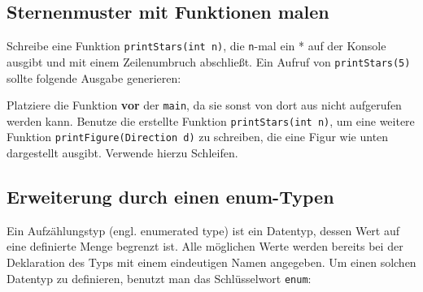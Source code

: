 \subsection{Sternenmuster mit Funktionen malen}

Schreibe eine Funktion \lstinline{printStars(int n)}, die \lstinline{n}-mal ein * auf der Konsole ausgibt und mit einem Zeilenumbruch abschließt.
Ein Aufruf von \lstinline{printStars(5)} sollte folgende Ausgabe generieren:


Platziere die Funktion \textbf{vor} der \lstinline{main}, da sie sonst von dort aus nicht aufgerufen werden kann.
Benutze die erstellte Funktion \lstinline{printStars(int n)}, um eine weitere Funktion \lstinline{printFigure(Direction d)} zu schreiben, die eine Figur wie unten dargestellt ausgibt.
Verwende hierzu Schleifen.



\subsection{Erweiterung durch einen enum-Typen}
\label{sec:basics_enumtype}
Ein Aufzählungstyp (engl. enumerated type) ist ein Datentyp, dessen Wert auf eine definierte Menge begrenzt ist. Alle möglichen Werte werden bereits bei der Deklaration des Typs mit einem eindeutigen Namen angegeben. Um einen solchen Datentyp zu definieren, benutzt man das Schlüsselwort \lstinline{enum}: 


